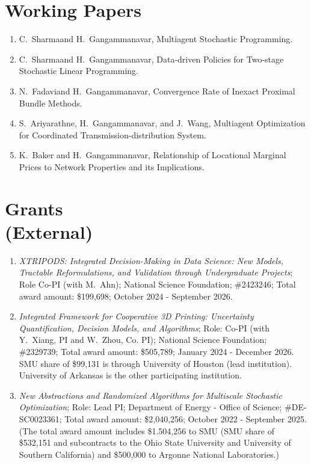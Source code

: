 \documentclass[hyperref, margin]{myResume}
\newif\ifpublic
\begin{document}
\begin{resume}
 \section{Working Papers}
\begin{enumerate}[label=W\arabic*., leftmargin=*]
	\item C.\ Sharma\footnotemark[4] and H.\ Gangammanavar, Multiagent Stochastic Programming. 
	\item C.\ Sharma\footnotemark[4] and H.\ Gangammanavar, Data-driven Policies for Two-stage Stochastic Linear Programming. 
	\item N.\ Fadavi\footnotemark[1] and H.\ Gangammanavar, Convergence Rate of Inexact Proximal Bundle Methods. 
	\item S.\ Ariyarathne\footnotemark[1], H.\ Gangammanavar, and J.\ Wang, Multiagent Optimization for Coordinated Transmission-distribution System.
	\item K.\ Baker and H.\ Gangammanavar, Relationship of Locational Marginal Prices to Network Properties and its Implications.	
\end{enumerate}

\section{Grants\\(External)}
\begin{enumerate}[label=G\arabic*., leftmargin=*]

	\item \emph{XTRIPODS: Integrated Decision-Making in Data Science: New Models, Tractable Reformulations, and Validation through Undergraduate Projects}; Role Co-PI (with M.\ Ahn); National Science Foundation; \#2423246; Total award amount: \$199,698; October 2024 - September 2026.

	\item \emph{Integrated Framework for Cooperative 3D Printing: Uncertainty Quantification, Decision Models, and Algorithms}; Role: Co-PI (with Y.\ Xiang, PI and W.\ Zhou, Co. PI); National Science Foundation; \#2329739; Total award amount: \$505,789; January 2024 - December 2026.\ifpublic \else \\ SMU share of \$99,131 is through University of Houston (lead institution). University of Arkansas is the other participating institution. \fi

	\item \emph{New Abstractions and Randomized Algorithms for Multiscale Stochastic Optimization}; Role: Lead PI; Department of Energy - Office of Science; \#DE-SC0023361; Total award amount: \$2,040,256; October 2022 - September 2025.\ifpublic \else \\
	(The total award amount includes \$1.504,256 to SMU (SMU share of \$532,151 and subcontracts to the Ohio State University and University of Southern California) and \$500,000 to Argonne National Laboratories.) \fi


\end{enumerate}
\end{resume}
\end{document}
